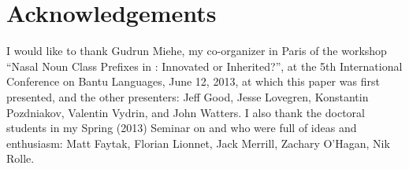 \documentclass[output=paper]{langsci/langscibook}
\begin{document}
\section*{Acknowledgements}

I would like to thank Gudrun Miehe, my co-organizer in Paris of the workshop “Nasal Noun Class Prefixes in : Innovated or Inherited?”, at the 5th International Conference on Bantu Languages, June 12, 2013, at which this paper was first presented, and the other presenters: Jeff Good, Jesse Lovegren, Konstantin Pozdniakov, Valentin Vydrin, and John Watters. I also thank the doctoral students in my Spring (2013) Seminar on  and  who were full of ideas and enthusiasm: Matt Faytak, Florian Lionnet, Jack Merrill, Zachary O’Hagan, Nik Rolle.

{\sloppy
\printbibliography[heading=subbibliography,notkeyword=this]
}
  
\end{document}
